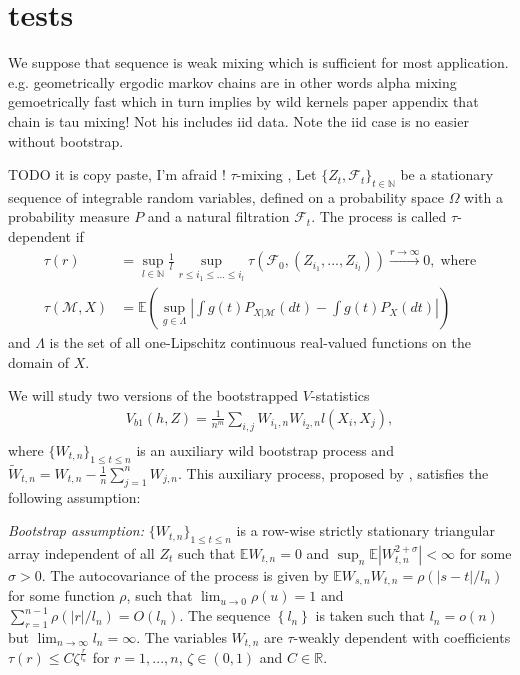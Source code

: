 \documentclass{article}
\newcommand{\ev}{\mathbb{E}}
\begin{document}
\section{tests}
We suppose that sequence is weak mixing which is sufficient for most application. e.g. geometrically ergodic  markov chains are in other words alpha mixing gemoetrically fast which in turn implies by wild kernels paper appendix that chain is tau mixing!   Not his includes iid data. Note the iid case is no easier without bootstrap.



TODO it is copy paste, I'm afraid !
 $\tau$-mixing \cite{dedecker2007weak}, 
Let $\{Z_t,\mathcal{F}_t\}_{t \in \mathbb{N}}$  be a stationary sequence of integrable random variables, defined on a probability space $\Omega$ with a probability measure $P$ and a natural filtration $\mathcal{F}_t$. The process  is called $\tau$-dependent if 
\begin{align*}
\tau(r) &= \sup_{l \in \mathbb{N}} \frac 1 l \sup_{ r \leq i_1 \leq ... \leq i_l} \tau( \mathcal F_0,(Z_{i_1},...,Z_{i_l}) )  \overset{r \to \infty}{\longrightarrow} 0,\;\text{where} \\
\tau(\mathcal{M},X) &=  \ev \left( \sup_{g \in \Lambda} \left| \int g(t) P_{X|\mathcal{M}}(dt) - \int g(t) P_X(dt) \right| \right)
\end{align*}
and $\Lambda$ is the set of all one-Lipschitz continuous real-valued functions on the domain of $X$. 

We will study two versions of the bootstrapped $V$-statistics  
\begin{align}
 V_{b1}(h,Z) = \frac{1}{n^m} \sum_{i,j} \nolimits W_{i_1,n} W_{i_2,n} l(X_i,X_j), \label{Vb1}\\ 
\end{align}
where $\{W_{t,n}\}_{1 \leq t \leq n }$ is an auxiliary wild bootstrap process and $\tilde W_{t,n} = W_{t,n} - \frac 1 n \sum_{j=1}^n W_{j,n}$. This auxiliary process, proposed by \cite{Shao2010,leucht_dependent_2013}, satisfies the following assumption:

\emph{Bootstrap assumption:} $\{W_{t,n}\}_{1 \leq t \leq n }$ is a row-wise strictly stationary triangular array independent of all $Z_t$ such that $\ev W_{t,n}=0$ and $\sup_{n} \ev|W_{t,n}^{2+\sigma}| < \infty$ for some $\sigma > 0$. The autocovariance of the process is given by $\ev W_{s,n} W_{t,n}=\rho(|s-t|/l_n)$ for some function $\rho$, such that $\lim_{u \to 0} \rho(u) = 1$ and $\sum_{r=1}^{n-1} \rho(|r|/l_n)= O(l_n)$. The sequence $\left\{l_n\right\}$ is taken such that $l_n=o(n)$ but $\lim_{n \to \infty} l_n = \infty$. The variables $W_{t,n}$  are $\tau$-weakly dependent with coefficients $\tau(r) \leq C \zeta^{\frac{r} {l_n}}$ for $r=1,...,n$, $\zeta \in (0,1)$ and $C\in\mathbb R$.
\end{document}
